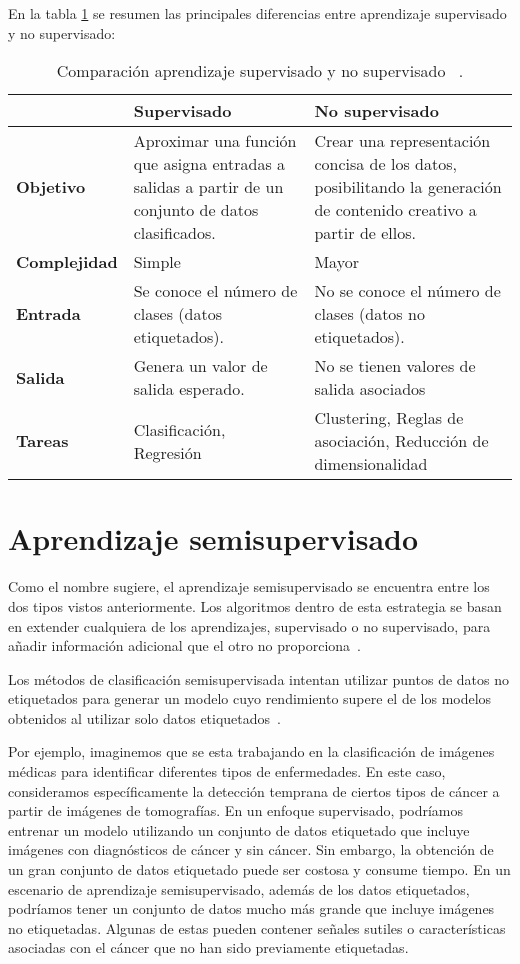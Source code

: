 En la tabla \ref{supervisado_VS_noSupervisado} se resumen las principales diferencias entre aprendizaje supervisado y no supervisado:
\begin{table}[ht]
	\centering
	\begin{tabular}{@{}p{2.5cm} p{5cm} p{5cm}@{}}
		\toprule
			 & \textbf{Supervisado} & \textbf{No supervisado} \\
		\midrule
		\textbf{Objetivo} & Aproximar una función que asigna entradas a salidas a partir de un conjunto de datos clasificados. & Crear una representación concisa de los datos, posibilitando la generación de contenido creativo a partir de ellos. \\
		\addlinespace[0.5em]
		\textbf{Complejidad} & Simple & Mayor\\
		\addlinespace[0.5em]
		\textbf{Entrada} & Se conoce el número de clases (datos etiquetados). & No se conoce el número de clases (datos no etiquetados). \\
		\addlinespace[0.5em]
		\textbf{Salida} & Genera un valor de salida esperado. & No se tienen valores de salida asociados \\
		\addlinespace[0.5em]
		\textbf{Tareas} & Clasificación, Regresión & Clustering, Reglas de asociación, Reducción de dimensionalidad \\
		\bottomrule
	\end{tabular}
	\caption[Aprendizaje supervisado \textit{vs} no supervisado]{Comparación aprendizaje supervisado y no supervisado ~\cite{USL:guide}.}
	\label{supervisado_VS_noSupervisado}
\end{table}
\newpage


\section{Aprendizaje semisupervisado}
Como el nombre sugiere, el aprendizaje semisupervisado se encuentra entre los dos tipos vistos anteriormente. Los algoritmos dentro de esta estrategia se basan en extender cualquiera de los aprendizajes, supervisado o no supervisado, para añadir información adicional que el otro no proporciona~\cite{Intro:SemiSupervised}.

Los métodos de clasificación semisupervisada intentan utilizar puntos de datos no etiquetados para generar un modelo cuyo rendimiento supere el de los modelos obtenidos al utilizar solo datos etiquetados~\cite{Engelen:semi-supervised}. 

Por ejemplo, imaginemos que se esta trabajando en la clasificación de imágenes médicas para identificar diferentes tipos de enfermedades. En este caso, consideramos específicamente la detección temprana de ciertos tipos de cáncer a partir de imágenes de tomografías. En un enfoque supervisado, podríamos entrenar un modelo utilizando un conjunto de datos etiquetado que incluye imágenes con diagnósticos de cáncer y sin cáncer. Sin embargo, la obtención de un gran conjunto de datos etiquetado puede ser costosa y consume tiempo. En un escenario de aprendizaje semisupervisado, además de los datos etiquetados, podríamos tener un conjunto de datos mucho más grande que incluye imágenes no etiquetadas. Algunas de estas pueden contener señales sutiles o características asociadas con el cáncer que no han sido previamente etiquetadas.

